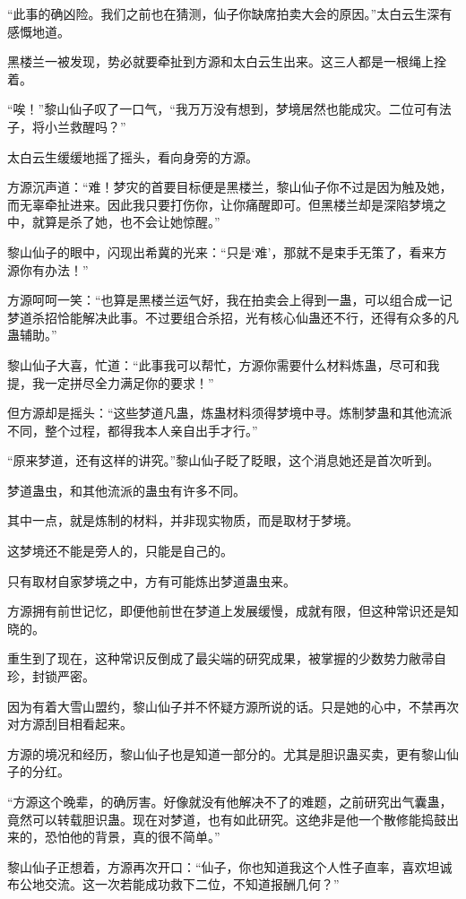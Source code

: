 \begin{this_body}
“此事的确凶险。我们之前也在猜测，仙子你缺席拍卖大会的原因。”太白云生深有感慨地道。

黑楼兰一被发现，势必就要牵扯到方源和太白云生出来。这三人都是一根绳上拴着。

“唉！”黎山仙子叹了一口气，“我万万没有想到，梦境居然也能成灾。二位可有法子，将小兰救醒吗？”

太白云生缓缓地摇了摇头，看向身旁的方源。

方源沉声道：“难！梦灾的首要目标便是黑楼兰，黎山仙子你不过是因为触及她，而无辜牵扯进来。因此我只要打伤你，让你痛醒即可。但黑楼兰却是深陷梦境之中，就算是杀了她，也不会让她惊醒。”

黎山仙子的眼中，闪现出希冀的光来：“只是‘难’，那就不是束手无策了，看来方源你有办法！”

方源呵呵一笑：“也算是黑楼兰运气好，我在拍卖会上得到一蛊，可以组合成一记梦道杀招恰能解决此事。不过要组合杀招，光有核心仙蛊还不行，还得有众多的凡蛊辅助。”

黎山仙子大喜，忙道：“此事我可以帮忙，方源你需要什么材料炼蛊，尽可和我提，我一定拼尽全力满足你的要求！”

但方源却是摇头：“这些梦道凡蛊，炼蛊材料须得梦境中寻。炼制梦蛊和其他流派不同，整个过程，都得我本人亲自出手才行。”

“原来梦道，还有这样的讲究。”黎山仙子眨了眨眼，这个消息她还是首次听到。

梦道蛊虫，和其他流派的蛊虫有许多不同。

其中一点，就是炼制的材料，并非现实物质，而是取材于梦境。

这梦境还不能是旁人的，只能是自己的。

只有取材自家梦境之中，方有可能炼出梦道蛊虫来。

方源拥有前世记忆，即便他前世在梦道上发展缓慢，成就有限，但这种常识还是知晓的。

重生到了现在，这种常识反倒成了最尖端的研究成果，被掌握的少数势力敝帚自珍，封锁严密。

因为有着大雪山盟约，黎山仙子并不怀疑方源所说的话。只是她的心中，不禁再次对方源刮目相看起来。

方源的境况和经历，黎山仙子也是知道一部分的。尤其是胆识蛊买卖，更有黎山仙子的分红。

“方源这个晚辈，的确厉害。好像就没有他解决不了的难题，之前研究出气囊蛊，竟然可以转载胆识蛊。现在对梦道，也有如此研究。这绝非是他一个散修能捣鼓出来的，恐怕他的背景，真的很不简单。”

黎山仙子正想着，方源再次开口：“仙子，你也知道我这个人性子直率，喜欢坦诚布公地交流。这一次若能成功救下二位，不知道报酬几何？”


\end{this_body}
